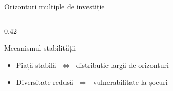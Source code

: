 \documentclass[9pt, aspectratio=169, t]{beamer}
\theoremstyle{definition}
\newenvironment{cminipage}[1]{%
    \par\noindent\hfill\begin{minipage}{#1}\ignorespaces
}{%
    \end{minipage}\hfill\null\par
}
\begin{document}
\begin{frame}[shrink=15]{Orizonturi multiple de investiție}
\begin{cminipage}{0.95\textwidth}
\begin{columns}[T]
\begin{column}{0.42\textwidth}

\vspace{0.4cm}

\begin{block}{Mecanismul stabilității}
\begin{itemize}\setlength{\itemsep}{0pt}
    \item \scriptsize Piață stabilă $\;\Longleftrightarrow\;$ distribuție largă de orizonturi
    \item \scriptsize Diversitate redusă $\;\Longrightarrow\;$ vulnerabilitate la șocuri
\end{itemize}
\end{block}
\end{column}
\end{columns}
\end{cminipage}
\end{frame}
\end{document}
